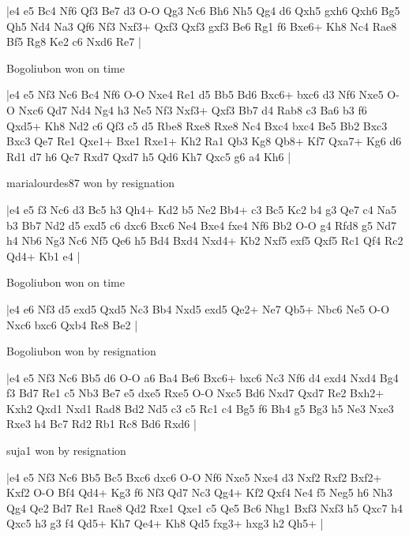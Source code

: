 \makegametitle
|e4 e5 Bc4 Nf6 Qf3 Be7 d3 O-O Qg3 Nc6 Bh6 Nh5 Qg4 d6 Qxh5 gxh6 Qxh6 Bg5 Qh5 Nd4 Na3 Qf6 Nf3 Nxf3+ Qxf3 Qxf3 gxf3 Be6 Rg1 f6 Bxe6+ Kh8 Nc4 Rae8 Bf5 Rg8 Ke2 c6 Nxd6 Re7  |

\showboard

Bogoliubon won on time

\makegametitle
|e4 e5 Nf3 Nc6 Bc4 Nf6 O-O Nxe4 Re1 d5 Bb5 Bd6 Bxc6+ bxc6 d3 Nf6 Nxe5 O-O Nxc6 Qd7 Nd4 Ng4 h3 Ne5 Nf3 Nxf3+ Qxf3 Bb7 d4 Rab8 c3 Ba6 b3 f6 Qxd5+ Kh8 Nd2 c6 Qf3 c5 d5 Rbe8 Rxe8 Rxe8 Nc4 Bxc4 bxc4 Be5 Bb2 Bxc3 Bxc3 Qe7 Re1 Qxe1+ Bxe1 Rxe1+ Kh2 Ra1 Qb3 Kg8 Qb8+ Kf7 Qxa7+ Kg6 d6 Rd1 d7 h6 Qc7 Rxd7 Qxd7 h5 Qd6 Kh7 Qxc5 g6 a4 Kh6  |

\showboard

marialourdes87 won by resignation

\makegametitle
|e4 e5 f3 Nc6 d3 Bc5 h3 Qh4+ Kd2 b5 Ne2 Bb4+ c3 Bc5 Kc2 b4 g3 Qe7 c4 Na5 b3 Bb7 Nd2 d5 exd5 c6 dxc6 Bxc6 Ne4 Bxe4 fxe4 Nf6 Bb2 O-O g4 Rfd8 g5 Nd7 h4 Nb6 Ng3 Nc6 Nf5 Qe6 h5 Bd4 Bxd4 Nxd4+ Kb2 Nxf5 exf5 Qxf5 Rc1 Qf4 Rc2 Qd4+ Kb1 e4  |

\showboard

Bogoliubon won on time

\makegametitle
|e4 e6 Nf3 d5 exd5 Qxd5 Nc3 Bb4 Nxd5 exd5 Qe2+ Ne7 Qb5+ Nbc6 Ne5 O-O Nxc6 bxc6 Qxb4 Re8 Be2  |

\showboard

Bogoliubon won by resignation

\makegametitle
|e4 e5 Nf3 Nc6 Bb5 d6 O-O a6 Ba4 Be6 Bxc6+ bxc6 Nc3 Nf6 d4 exd4 Nxd4 Bg4 f3 Bd7 Re1 c5 Nb3 Be7 e5 dxe5 Rxe5 O-O Nxc5 Bd6 Nxd7 Qxd7 Re2 Bxh2+ Kxh2 Qxd1 Nxd1 Rad8 Bd2 Nd5 c3 c5 Rc1 c4 Bg5 f6 Bh4 g5 Bg3 h5 Ne3 Nxe3 Rxe3 h4 Bc7 Rd2 Rb1 Rc8 Bd6 Rxd6  |

\showboard

suja1 won by resignation

\makegametitle
|e4 e5 Nf3 Nc6 Bb5 Bc5 Bxc6 dxc6 O-O Nf6 Nxe5 Nxe4 d3 Nxf2 Rxf2 Bxf2+ Kxf2 O-O Bf4 Qd4+ Kg3 f6 Nf3 Qd7 Nc3 Qg4+ Kf2 Qxf4 Ne4 f5 Neg5 h6 Nh3 Qg4 Qe2 Bd7 Re1 Rae8 Qd2 Rxe1 Qxe1 c5 Qe5 Bc6 Nhg1 Bxf3 Nxf3 h5 Qxc7 h4 Qxc5 h3 g3 f4 Qd5+ Kh7 Qe4+ Kh8 Qd5 fxg3+ hxg3 h2 Qh5+  |

